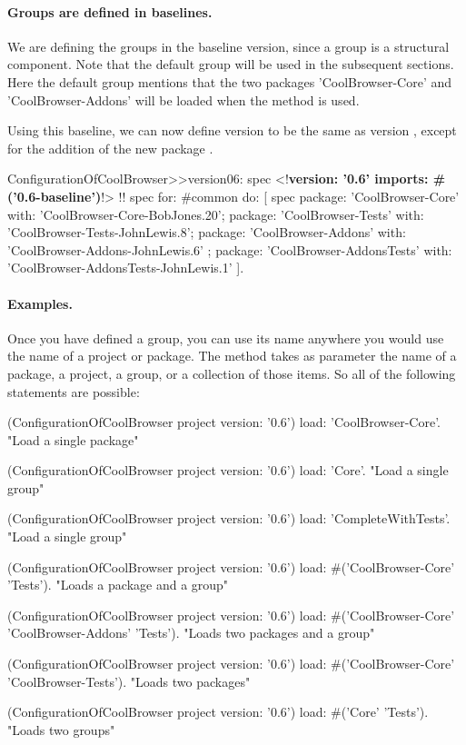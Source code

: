 \documentclass[a4paper,10pt,twoside]{book}
\begin{document}
\paragraph{Groups are defined in baselines.}
We are defining the groups in the baseline version, since a group is a structural component. Note that the default group will be used in the subsequent sections. Here the default group mentions that the two packages 'CoolBrowser-Core' and 'CoolBrowser-Addons' will be loaded when the method  is used.

Using this baseline, we can now define version  to be the same as version , except for the addition of the new package .

\begin{code}{}
ConfigurationOfCoolBrowser>>version06: spec
       <!\textbf{version: '0.6' imports: \#('0.6-baseline')}!>
!\vspace{-0.7ex}!
      spec for: #common do: [
            spec
                  package: 'CoolBrowser-Core' with: 'CoolBrowser-Core-BobJones.20';
                  package: 'CoolBrowser-Tests' with: 'CoolBrowser-Tests-JohnLewis.8';
                  package: 'CoolBrowser-Addons' with: 'CoolBrowser-Addons-JohnLewis.6' ;
                  package: 'CoolBrowser-AddonsTests' with: 'CoolBrowser-AddonsTests-JohnLewis.1' ].
\end{code}



\paragraph{Examples.} Once you have defined a group, you can use its name anywhere you would use the name of a project or package. The   method takes as parameter the name of a package, a project, a group, or a collection of those items.  So all of the following statements are possible:


\begin{code}{}
(ConfigurationOfCoolBrowser project version: '0.6') load: 'CoolBrowser-Core'.
       "Load a single package"

(ConfigurationOfCoolBrowser project version: '0.6') load: 'Core'.
       "Load a single group"

(ConfigurationOfCoolBrowser project version: '0.6') load: 'CompleteWithTests'.
       "Load a single group"

(ConfigurationOfCoolBrowser project version: '0.6')
       load: #('CoolBrowser-Core' 'Tests').
       "Loads a package and a group"

(ConfigurationOfCoolBrowser project version: '0.6')
       load: #('CoolBrowser-Core' 'CoolBrowser-Addons' 'Tests').
       "Loads two packages and a group"

(ConfigurationOfCoolBrowser project version: '0.6')
       load: #('CoolBrowser-Core' 'CoolBrowser-Tests').
       "Loads two packages"

(ConfigurationOfCoolBrowser project version: '0.6') load: #('Core' 'Tests').
       "Loads two groups"
\end{code}
\end{document}
